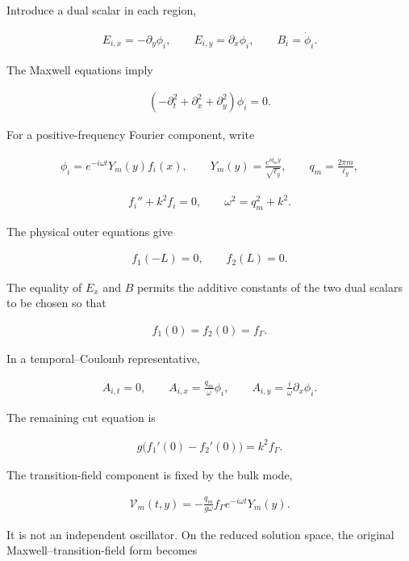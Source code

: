 Introduce a dual scalar in each region,

\begin{align}
E_{i,x}=-\partial_y\phi_i,
\qquad
E_{i,y}=\partial_x\phi_i,
\qquad
B_i=\dot\phi_i.
\end{align}

The Maxwell equations imply

\begin{align}
(-\partial_t^2+\partial_x^2+\partial_y^2)\phi_i=0.
\end{align}

For a positive-frequency Fourier component, write

\begin{align}
\phi_i=e^{-i\omega t}Y_m(y)f_i(x),
\qquad
Y_m(y)=\frac{e^{iq_my}}{\sqrt{\ell_y}},
\qquad
q_m=\frac{2\pi m}{\ell_y},
\end{align}

\begin{align}
f_i''+k^2f_i=0,
\qquad
\omega^2=q_m^2+k^2.
\end{align}

The physical outer equations give

\begin{align}
f_1(-L)=0,
\qquad
f_2(L)=0.
\end{align}

The equality of $E_x$ and $B$ permits the additive constants of the two dual scalars to be chosen so that

\begin{align}
f_1(0)=f_2(0)=f_\Gamma.
\end{align}

In a temporal--Coulomb representative,

\begin{align}
A_{i,t}=0,
\qquad
A_{i,x}=\frac{q_m}{\omega}\phi_i,
\qquad
A_{i,y}=\frac{i}{\omega}\partial_x\phi_i.
\end{align}

The remaining cut equation is

\begin{align}
g\bigl(f_1'(0)-f_2'(0)\bigr)=k^2f_\Gamma.
\end{align}

The transition-field component is fixed by the bulk mode,

\begin{align}
\mathcal V_m(t,y)
=-\frac{q_m}{g\omega}f_\Gamma e^{-i\omega t}Y_m(y).
\end{align}

It is not an independent oscillator. On the reduced solution space, the original Maxwell--transition-field form becomes

